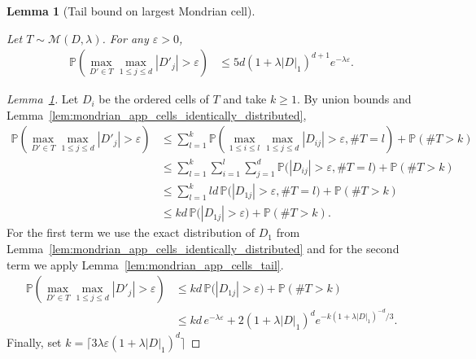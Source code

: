 \documentclass[11pt,lof]{puthesis}
\renewcommand{\P}{\ensuremath{\mathbb{P}}}
\newcommand{\cM}{\ensuremath{\mathcal{M}}}
\theoremstyle{break}
\newtheorem{lemma}{Lemma}[section]
\theoremstyle{proof}
\newtheorem{proof}{Proof}
\begin{document}
\begin{lemma}[Tail bound on largest Mondrian cell]
  \label{lem:mondrian_app_largest_cell_tail}

  Let $T \sim \cM(D, \lambda)$.
  For any $\varepsilon > 0$,
  \begin{align*}
    \P\left(
      \max_{D' \in T}
      \max_{1 \leq j \leq d}
      |D'_j| > \varepsilon
    \right)
    &\leq
    5d (1 + \lambda |D|_1)^{d+1}
    e^{-\lambda \varepsilon}.
  \end{align*}
\end{lemma}

\begin{proof}[Lemma~\ref{lem:mondrian_app_largest_cell_tail}]

  Let $D_i$ be the ordered cells of $T$ and take $k \geq 1$.
  By union bounds and
  Lemma~\ref{lem:mondrian_app_cells_identically_distributed},
  \begin{align*}
    \P\left(
      \max_{D' \in T}
      \max_{1 \leq j \leq d}
      |D'_j| > \varepsilon
    \right)
    &\leq
    \sum_{l=1}^k
    \P\left(
      \max_{1 \leq i \leq l}
      \max_{1 \leq j \leq d}
      |D_{i j}| > \varepsilon,
      \# T = l
    \right)
    + \P\left( \# T > k \right) \\
    &\leq
    \sum_{l=1}^k
    \sum_{i=1}^l
    \sum_{j=1}^d
    \P\big(
      |D_{i j}| > \varepsilon,
      \# T = l
    \big)
    + \P\left( \# T > k \right) \\
    &\leq
    \sum_{l=1}^k
    l d \,
    \P\big(
      |D_{1j}| > \varepsilon,
      \# T = l
    \big)
    + \P\left( \# T > k \right) \\
    &\leq
    k d \,
    \P\big(|D_{1 j}| > \varepsilon \big)
    + \P\left( \# T > k \right).
  \end{align*}
  For the first term we use the exact distribution of
  $D_1$ from Lemma~\ref{lem:mondrian_app_cells_identically_distributed}
  and for the second term we apply Lemma~\ref{lem:mondrian_app_cells_tail}.
  \begin{align*}
    \P\left(
      \max_{D' \in T}
      \max_{1 \leq j \leq d}
      |D'_j| > \varepsilon
    \right)
    &\leq
    k d \, \P\big(|D_{1 j}| > \varepsilon \big)
    + \P\left( \# T > k \right) \\
    &\leq
    k d \, e^{-\lambda \varepsilon}
    + 2 (1 + \lambda |D|_1)^d
    e^{-k (1 + \lambda |D|_1)^{-d} / 3}.
  \end{align*}
  Finally, set
  $k = \big\lceil 3 \lambda \varepsilon (1 + \lambda |D|_1)^d \big\rceil$

\end{proof}
\end{document}
